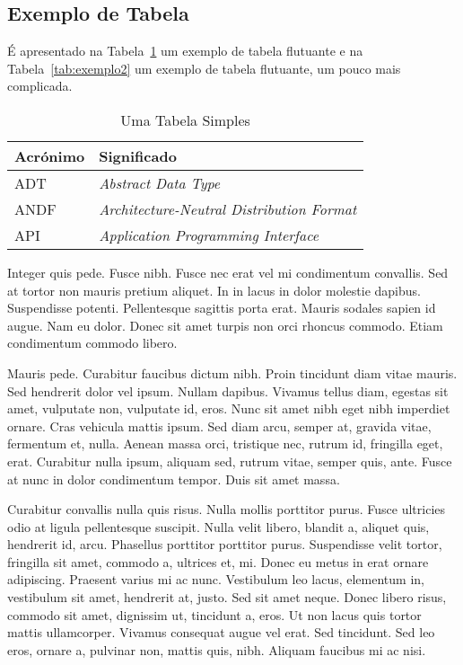 \subsection{Exemplo de Tabela}

É apresentado na Tabela~\ref{tab:exemplo1} um exemplo de tabela
flutuante e na Tabela~\ref{tab:exemplo2} um exemplo de tabela
flutuante, um pouco mais complicada.

\begin{table}[t]
  \centering
  \caption{Uma Tabela Simples}
\begin{tabular}{| l | p{45mm} |}
	\hline
\textbf{Acrónimo} & \textbf{Significado}\\
	\hline
	\hline
        ADT   & \emph{Abstract Data Type}\\\hline
        ANDF  & \emph{Architecture-Neutral Distribution Format}\\\hline
        API   & \emph{Application Programming Interface}\\
	\hline
\end{tabular}
  \label{tab:exemplo1}
\end{table}

Integer quis pede. Fusce nibh. Fusce nec erat vel mi condimentum
convallis. Sed at tortor non mauris pretium aliquet. In in lacus in
dolor molestie dapibus. Suspendisse potenti. Pellentesque sagittis
porta erat. Mauris sodales sapien id augue. Nam eu dolor. Donec sit
amet turpis non orci rhoncus commodo. Etiam condimentum commodo
libero.

Mauris pede. Curabitur faucibus dictum nibh. Proin tincidunt diam
vitae mauris. Sed hendrerit dolor vel ipsum. Nullam dapibus. Vivamus
tellus diam, egestas sit amet, vulputate non, vulputate id, eros. Nunc
sit amet nibh eget nibh imperdiet ornare. Cras vehicula mattis
ipsum. Sed diam arcu, semper at, gravida vitae, fermentum et,
nulla. Aenean massa orci, tristique nec, rutrum id, fringilla eget,
erat. Curabitur nulla ipsum, aliquam sed, rutrum vitae, semper quis,
ante. Fusce at nunc in dolor condimentum tempor. Duis sit amet massa. 

Curabitur convallis nulla quis risus. Nulla mollis porttitor
purus. Fusce ultricies odio at ligula pellentesque suscipit. Nulla
velit libero, blandit a, aliquet quis, hendrerit id, arcu. Phasellus
porttitor porttitor purus. Suspendisse velit tortor, fringilla sit
amet, commodo a, ultrices et, mi. Donec eu metus in erat ornare
adipiscing. Praesent varius mi ac nunc. Vestibulum leo lacus,
elementum in, vestibulum sit amet, hendrerit at, justo. Sed sit amet
neque. Donec libero risus, commodo sit amet, dignissim ut, tincidunt
a, eros. Ut non lacus quis tortor mattis ullamcorper. Vivamus
consequat augue vel erat. Sed tincidunt. Sed leo eros, ornare a,
pulvinar non, mattis quis, nibh. Aliquam faucibus mi ac nisi.

